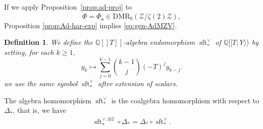 \documentclass[15pt,oneside,reqno]{amsart}
\newcounter{dfcounter}
\newtheorem{df}{Definition}[dfcounter]
\theoremstyle{remark}{
\newtheorem{lem}[df]{Lemma}
\newtheorem{prop}[df]{Proposition}
\newtheorem{ex}[df]{Example}
\newtheorem{rmk}[df]{Remark}
}
\newcommand{\ide}[1]{\mathfrak{#1}}
\newcommand{\Q}{\mathbb{Q}}
\newcommand{\DMR}{\mathrm{DMR}}
\newcommand{\cotimes}{\widehat{\otimes}}
\DeclareMathOperator{\sft}{sft}
\begin{document}
\begin{rmk}
If we apply Proposition~\ref{prop:ad-proj} to
\[
\Phi =\overline{\Phi}_{\shuffle} \in \DMR_0(\mathcal{Z}/\zeta(2)\mathcal{Z}),
\]
Proposition \ref{prop:Ad-har-exp} implies \eqref{eq:gen-AdMZV}.
\end{rmk}

\begin{df}
We define the $\Q[[T]]$-algebra endomorphism $\sft_*^{\vee}$ of $\Q[[T;Y \rangle\rangle$ by setting, for each $k\ge 1$,
\[
y_k \longmapsto \sum_{j=0}^{k-1} \binom{k-1}{j} (-T)^{j} y_{k-j}.
\]
we use the same symbol $\sft_{*}^{\vee}$ after extension of scalars.
\end{df}
\begin{prop}\label{eq:sft-coalg}
The algebra homomorphism $\sft_*^{\vee}$ is the coalgebra homomorphism with respect to $\Delta_*$, that is, we have
\begin{align*}
\sft_*^{\vee,\otimes 2}\circ \Delta_* = \Delta_*\circ \sft_*^{\vee}.
\end{align*}
\end{prop}
\end{document}
